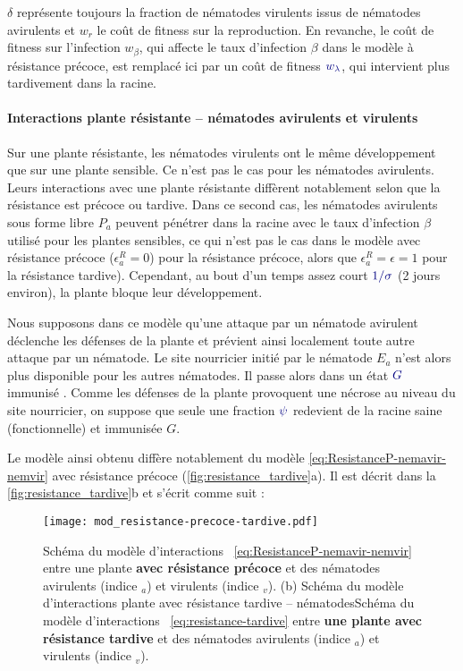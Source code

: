 $\delta$ représente toujours la fraction de nématodes virulents issus de nématodes avirulents et $w_r$ le coût de fitness sur la reproduction. En revanche, le coût de fitness sur l'infection $w_\beta$, qui affecte le taux d'infection $\beta$ dans le modèle à résistance précoce, est remplacé ici par un coût de fitness $\textcolor{navyblue}{w_\lambda}$, qui intervient plus tardivement dans la racine. 

\paragraph{Interactions plante résistante --  nématodes avirulents et virulents}

Sur une plante résistante, les nématodes virulents ont le même développement que sur une plante sensible. Ce n'est pas le cas pour les nématodes avirulents. Leurs interactions avec une plante résistante diffèrent notablement selon que la résistance est précoce ou tardive. Dans ce second cas, les nématodes avirulents sous forme libre $P_a$ peuvent pénétrer dans la racine avec le taux d'infection $\beta$ utilisé pour les plantes sensibles, ce qui n'est pas le cas dans le modèle avec résistance précoce ($\epsilon_a^R=0$) pour la résistance précoce, alors que $\epsilon_a^R=\epsilon=1$ pour la résistance tardive). Cependant, au bout d'un temps assez court $\textcolor{navyblue}{1/\sigma}$ (2 jours environ), la plante bloque leur développement.

Nous supposons dans ce modèle qu'une attaque par un nématode avirulent déclenche les défenses de la plante et prévient ainsi localement toute autre attaque par un nématode. Le site nourricier initié par le nématode $E_a$ n'est alors plus disponible pour les autres nématodes. Il passe alors dans un état $\textcolor{navyblue}{G}$ \og immunisé \fg{}. Comme les défenses de la plante provoquent une nécrose au niveau du site nourricier, on suppose que seule une fraction $\textcolor{navyblue}{\psi}$ redevient de la racine saine (fonctionnelle) et immunisée $G$.

Le modèle ainsi obtenu diffère notablement du modèle \eqref{eq:ResistanceP-nemavir-nemvir} 
 avec résistance précoce (\autoref{fig:resistance_tardive}a). Il est décrit dans la \autoref{fig:resistance_tardive}b et s'écrit comme suit :

\begin{figure}[h]
   \texttt{[image: mod\_resistance-precoce-tardive.pdf]}
  \caption[(a)  Schéma du modèle d'interactions plante avec résistance tardive -- nématodes]{Schéma du modèle d'interactions ~\eqref{eq:ResistanceP-nemavir-nemvir} entre une plante \textbf{avec résistance précoce} et des nématodes avirulents (indice $_a$) et virulents (indice $_v$).  (b)  Schéma du modèle d'interactions plante avec résistance tardive -- nématodesSchéma du modèle d'interactions ~\eqref{eq:resistance-tardive} entre \textbf{une plante avec résistance tardive} et des nématodes avirulents (indice $_a$) et virulents (indice $_v$).}
  \label{fig:resistance_tardive}
\end{figure}

